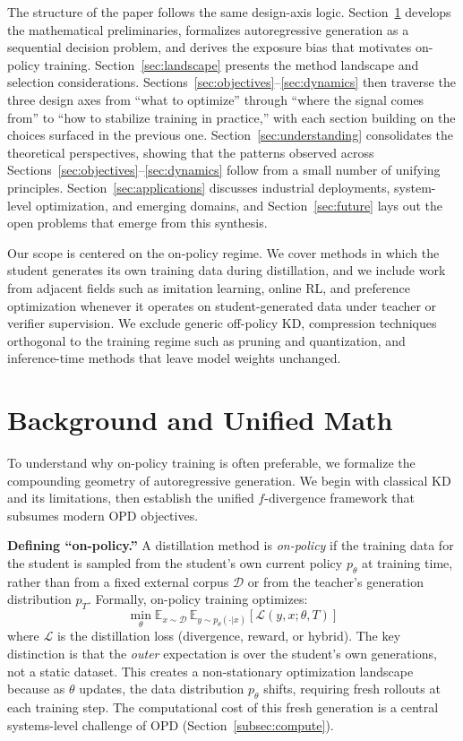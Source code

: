 \documentclass{article} %
\newcommand{\E}{\mathbb{E}}
\newcommand{\ptheta}{p_\theta}
\newcommand{\pteacher}{p_T}
\begin{document}
The structure of the paper follows the same design-axis logic. Section~\ref{sec:background} develops the mathematical preliminaries, formalizes autoregressive generation as a sequential decision problem, and derives the exposure bias that motivates on-policy training. Section~\ref{sec:landscape} presents the method landscape and selection considerations. Sections~\ref{sec:objectives}--\ref{sec:dynamics} then traverse the three design axes from ``what to optimize'' through ``where the signal comes from'' to ``how to stabilize training in practice,'' with each section building on the choices surfaced in the previous one. Section~\ref{sec:understanding} consolidates the theoretical perspectives, showing that the patterns observed across Sections~\ref{sec:objectives}--\ref{sec:dynamics} follow from a small number of unifying principles. Section~\ref{sec:applications} discusses industrial deployments, system-level optimization, and emerging domains, and Section~\ref{sec:future} lays out the open problems that emerge from this synthesis.

Our scope is centered on the on-policy regime. We cover methods in which the student generates its own training data during distillation, and we include work from adjacent fields such as imitation learning, online RL, and preference optimization whenever it operates on student-generated data under teacher or verifier supervision. We exclude generic off-policy KD, compression techniques orthogonal to the training regime such as pruning and quantization, and inference-time methods that leave model weights unchanged.

\section{Background and Unified Math}
\label{sec:background}

To understand why on-policy training is often preferable, we formalize the compounding geometry of autoregressive generation. We begin with classical KD and its limitations, then establish the unified $f$-divergence framework that subsumes modern OPD objectives.

\textbf{Defining ``on-policy.''} A distillation method is \emph{on-policy} if the training data for the student is sampled from the student's own current policy $\ptheta$ at training time, rather than from a fixed external corpus $\mathcal{D}$ or from the teacher's generation distribution $\pteacher$. Formally, on-policy training optimizes:
\begin{equation*}
    \min_\theta \E_{x \sim \mathcal{D}}\, \E_{y \sim \ptheta(\cdot|x)} \left[ \mathcal{L}(y, x; \theta, T) \right]
\end{equation*}
where $\mathcal{L}$ is the distillation loss (divergence, reward, or hybrid). The key distinction is that the \emph{outer} expectation is over the student's own generations, not a static dataset. This creates a non-stationary optimization landscape because as $\theta$ updates, the data distribution $\ptheta$ shifts, requiring fresh rollouts at each training step. The computational cost of this fresh generation is a central systems-level challenge of OPD (Section~\ref{subsec:compute}).
\end{document}

